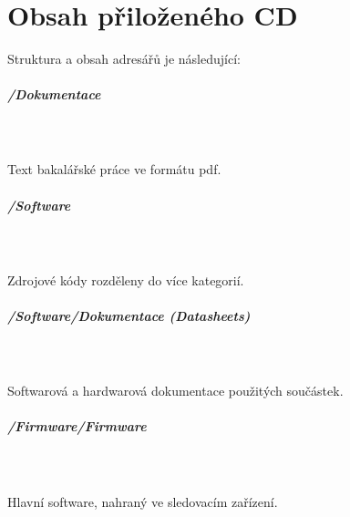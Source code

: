 \documentclass[FM,MP]{tulthesis}  %
\begin{document}

\appendix
\chapter{Obsah přiloženého CD}
Struktura a obsah adresářů je následující:

\paragraph{/Dokumentace}\mbox{}\\\mbox{}\\
Text bakalářské práce ve formátu pdf.

\paragraph{/Software}\mbox{}\\\mbox{}\\
Zdrojové kódy rozděleny do více kategorií.

\paragraph{/Software/Dokumentace (Datasheets)}\mbox{}\\\mbox{}\\
Softwarová a hardwarová dokumentace použitých součástek.

\paragraph{/Firmware/Firmware}\mbox{}\\\mbox{}\\
Hlavní software, nahraný ve sledovacím zařízení.
\end{document}
